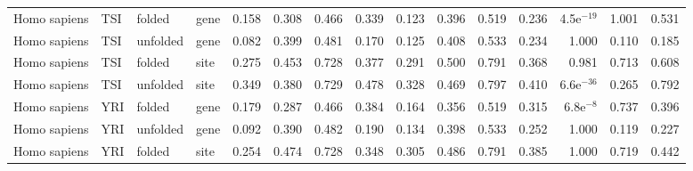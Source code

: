 \begin{longtable}{llllrrrrrrrrrrr}
        Homo sapiens &                       TSI &    folded &  gene &                              0.158 &                               0.308 &                 0.466 &                 0.339 &                              0.123 &                               0.396 &                 0.519 &                 0.236 &  4.5e$^{-19}$ &  1.001 &  0.531 \\
        Homo sapiens &                       TSI &  unfolded &  gene &                              0.082 &                               0.399 &                 0.481 &                 0.170 &                              0.125 &                               0.408 &                 0.533 &                 0.234 &         1.000 &  0.110 &  0.185 \\
        Homo sapiens &                       TSI &    folded &  site &                              0.275 &                               0.453 &                 0.728 &                 0.377 &                              0.291 &                               0.500 &                 0.791 &                 0.368 &         0.981 &  0.713 &  0.608 \\
        Homo sapiens &                       TSI &  unfolded &  site &                              0.349 &                               0.380 &                 0.729 &                 0.478 &                              0.328 &                               0.469 &                 0.797 &                 0.410 &  6.6e$^{-36}$ &  0.265 &  0.792 \\
        Homo sapiens &                       YRI &    folded &  gene &                              0.179 &                               0.287 &                 0.466 &                 0.384 &                              0.164 &                               0.356 &                 0.519 &                 0.315 &   6.8e$^{-8}$ &  0.737 &  0.396 \\
        Homo sapiens &                       YRI &  unfolded &  gene &                              0.092 &                               0.390 &                 0.482 &                 0.190 &                              0.134 &                               0.398 &                 0.533 &                 0.252 &         1.000 &  0.119 &  0.227 \\
        Homo sapiens &                       YRI &    folded &  site &                              0.254 &                               0.474 &                 0.728 &                 0.348 &                              0.305 &                               0.486 &                 0.791 &                 0.385 &         1.000 &  0.719 &  0.442 \\

\end{longtable}
